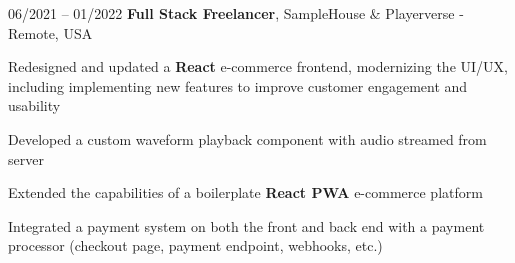 

\begin{twocolentry}{
    06/2021 – 01/2022
}
\fontsize{11 pt}{11 pt}\textbf{Full Stack Freelancer}, SampleHouse \& Playerverse - Remote, USA\end{twocolentry}

\vspace{0.10 cm}
\begin{onecolentry}
   \begin{highlights}
       \item Redesigned and updated a \textbf{React} e-commerce frontend, modernizing the UI/UX, including implementing new features to improve customer engagement and usability
       \item Developed a custom waveform playback component with audio streamed from server
       \item Extended the capabilities of a boilerplate \textbf{React PWA} e-commerce platform
       \item Integrated a payment system on both the front and back end with a payment processor (checkout page, payment endpoint, webhooks, etc.)
   \end{highlights}
\end{onecolentry}